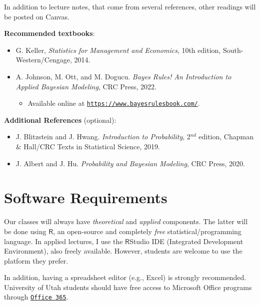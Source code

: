 \documentclass[11pt,]{article}
\providecommand{\tightlist}{%
  \setlength{\itemsep}{0pt}\setlength{\parskip}{0pt}}
\begin{document}
In addition to lecture notes, that come from several references, other
readings will be posted on Canvas.

\bigskip

\textbf{Recommended textbooks}:

\begin{itemize}
\item
  G. Keller, \emph{Statistics for Management and Economics}, 10th
  edition, South-Western/Cengage, 2014.
\item
  A. Johnson, M. Ott, and M. Dogucu. \emph{Bayes Rules! An Introduction
  to Applied Bayesian Modeling}, CRC Press, 2022.

  \begin{itemize}
  \tightlist
  \item
    Available online at
    \href{https://www.bayesrulesbook.com/}{\texttt{https://www.bayesrulesbook.com/}}.
  \end{itemize}
\end{itemize}

\bigskip

\textbf{Additional References} (optional):

\begin{itemize}
\item
  J. Blitzstein and J. Hwang. \emph{Introduction to Probability},
  2\(^{nd}\) edition, Chapman \& Hall/CRC Texts in Statistical Science,
  2019.
\item
  J. Albert and J. Hu. \emph{Probability and Bayesian Modeling}, CRC
  Press, 2020.
\end{itemize}

\bigskip

\hypertarget{software-requirements}{%
\section{Software Requirements}\label{software-requirements}}

\vspace{.3cm}

Our classes will always have \emph{theoretical} and \emph{applied}
components. The latter will be done using \(\textsf{R}\), an open-source
and completely \emph{free} statistical/programming language. In applied
lectures, I use the \(\textsf{R}\)Studio IDE (Integrated Development
Environment), also freely available. However, students are welcome to
use the platform they prefer.

In addition, having a spreadsheet editor (e.g., Excel) is strongly
recommended. University of Utah students should have free access to
Microsoft Office programs through
\href{https://o365cloud.utah.edu/}{\texttt{Office\ 365}}.
\end{document}
